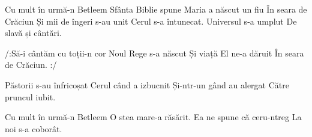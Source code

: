 

\beginverse
Cu mult în urmă-n Betleem
Sfânta Biblie spune
Maria a născut un fiu
În seara de Crăciun
Și mii de îngeri s-au unit
Cerul s-a întunecat.
Universul s-a umplut
De slavă și cântări.
\endverse

\beginchorus
/:Să-i cântăm cu toții-n cor
Noul Rege s-a născut
Și viață El ne-a dăruit
În seara de Crăciun. :/
\endchorus

\beginverse
Păstorii s-au înfricoșat
Cerul când a izbucnit
Și-ntr-un gând au alergat
Către pruncul iubit.
\endverse

\beginverse
Cu mult în urmă-n Betleem
O stea mare-a răsărit.
Ea ne spune că ceru-ntreg
La noi s-a coborât.
\endverse

\endsong
